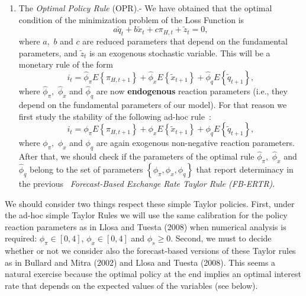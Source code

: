 \documentclass{article}
\begin{document}
\begin{enumerate}
\item The \textit{Optimal Policy Rule} (OPR).- We have obtained that the
optimal condition of the minimization problem of the Loss Function is%
\begin{equation}
a\widetilde{q}_{t}+b\widetilde{x}_{t}+c\pi _{H,t}+\widetilde{z}_{t}=0,
\label{OPR}
\end{equation}%
where $a,$ $b$ and $c$ are reduced parameters that depend on the fundamental
parameters, and $\widetilde{z}_{t}$ is an exogenous stochastic variable.
This will be a monetary rule of the form%
\begin{equation*}
i_{t}=\widehat{\phi }_{\pi }E\left\{ \pi _{H,t+1}\right\} +\widehat{\phi }%
_{x}E\left\{ \widetilde{x}_{t+1}\right\} +\widehat{\phi }_{q}E\left\{ 
\widetilde{q}_{t+1}\right\} ,
\end{equation*}%
where $\widehat{\phi }_{\pi },$ $\widehat{\phi }_{x}$ and $\widehat{\phi }%
_{q}$ are now \textbf{endogenous} reaction parameters (i.e., they depend on
the fundamental parameters of our model). For that reason we first study the
stability of the following ad-hoc rule\ :%
\begin{equation}
i_{t}=\phi _{\pi }E\left\{ \pi _{H,t+1}\right\} +\phi _{x}E\left\{ 
\widetilde{x}_{t+1}\right\} +\phi _{q}E\left\{ \widetilde{q}_{t+1}\right\} ,
\label{FB-ERTR}
\end{equation}%
where $\phi _{\pi },$ $\phi _{x}$ and $\phi _{q}$ are again exogenous
non-negative reaction parameters. After that, we should check if the
parameters of the optimal rule $\widehat{\phi }_{\pi },$ $\widehat{\phi }_{x}
$ and $\widehat{\phi }_{q}$ belong to the set of parameters $\left\{ \phi
_{\pi },\phi _{x},\phi _{q}\right\} $ that report determinacy in the previous%
\textit{\ Forecast-Based Exchange Rate Taylor Rule (FB-ERTR)}.
\end{enumerate}

We should consider two things respect these simple Taylor policies. First,
under the ad-hoc simple Taylor Rules we will use the same calibration for
the policy reaction parameters as in Llosa and Tuesta (2008) when numerical
analysis is required: $\phi _{\pi }\in \left[ 0,4\right] $, $\phi _{x}\in %
\left[ 0,4\right] $ and $\phi _{s}\geq 0.$ Second, we must to decide whether
or not we consider also the forecast-based versions of these Taylor rules as
in Bullard and Mitra (2002) and Llosa and Tuesta (2008). This seems a
natural exercise because the optimal policy at the end implies an optimal
interest rate that depends on the expected values of the variables (see
below).
\end{document}
